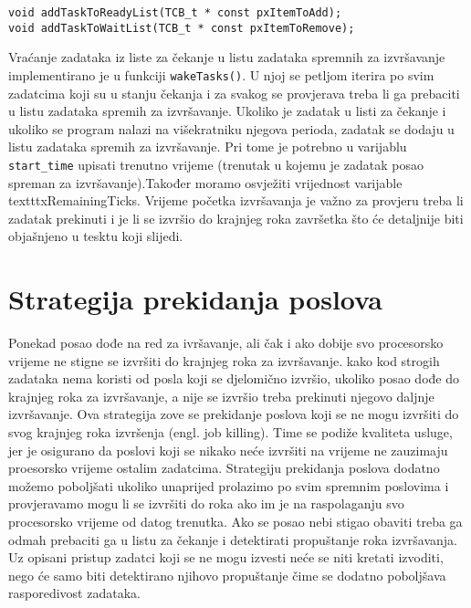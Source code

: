 \documentclass[../zavrsni.tex]{subfiles}
\begin{document}
\begin{lstlisting}[style=CStyle,caption={Deklaracije funkcija za dodavanje zadataka u opisane liste},captionpos=b]
void addTaskToReadyList(TCB_t * const pxItemToAdd);
void addTaskToWaitList(TCB_t * const pxItemToRemove);
\end{lstlisting}


Vraćanje zadataka iz liste za čekanje u listu zadataka spremnih za izvršavanje implementirano je u funkciji \texttt{wakeTasks()}.
U njoj se petljom iterira po svim zadatcima koji su u stanju čekanja i za svakog se provjerava treba li ga prebaciti u listu zadataka 
spremih za izvršavanje.
Ukoliko je zadatak u listi za čekanje i ukoliko se program nalazi na višekratniku njegova perioda, zadatak se dodaju u listu 
zadataka spremih za izvršavanje. Pri tome je potrebno u varijablu \texttt{start\_time} upisati trenutno vrijeme (trenutak u kojemu je 
zadatak posao spreman za izvršavanje).Također moramo osvježiti vrijednost varijable texttt{xRemainingTicks}. 
Vrijeme početka izvršavanja je važno za provjeru treba li zadatak prekinuti i je li se izvršio do krajnjeg roka završetka 
što će detaljnije biti objašnjeno u tesktu koji slijedi.


\section{Strategija prekidanja poslova}

Ponekad posao dođe na red za ivršavanje, ali čak i ako dobije svo procesorsko vrijeme ne stigne se izvršiti do krajnjeg roka za izvršavanje.
kako kod strogih zadataka nema koristi od posla koji se djelomično izvršio, ukoliko posao dođe do krajnjeg roka za izvršavanje, a nije se izvršio
 treba prekinuti njegovo daljnje izvršavanje. Ova strategija zove se prekidanje poslova koji se ne mogu izvršiti do svog 
 krajnjeg roka izvršenja (engl. job killing). Time se podiže kvaliteta usluge, jer je osigurano da poslovi koji se nikako neće 
 izvršiti na vrijeme ne zauzimaju proesorsko vrijeme ostalim zadatcima. Strategiju prekidanja poslova dodatno možemo poboljšati
 ukoliko unaprijed prolazimo po svim spremnim poslovima i provjeravamo mogu li se izvršiti do roka ako im je na raspolaganju svo 
 procesorsko vrijeme od datog trenutka. Ako se posao nebi stigao obaviti treba ga odmah prebaciti ga u listu za čekanje i detektirati 
 propuštanje roka izvršavanja. Uz opisani pristup zadatci koji se ne mogu izvesti neće se niti kretati izvoditi, nego će samo
 biti detektirano njihovo propuštanje čime se dodatno poboljšava rasporedivost zadataka.
\end{document}
